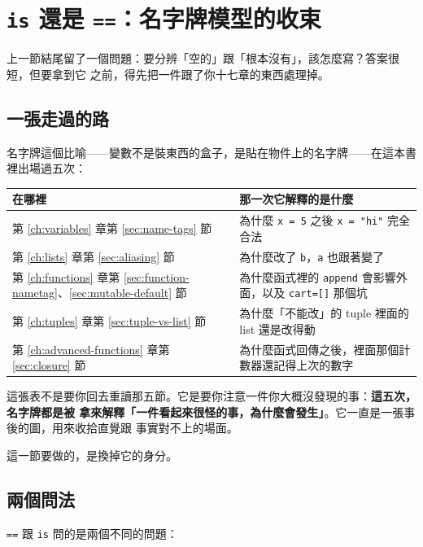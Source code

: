 \section{\texttt{is} 還是 \texttt{==}：名字牌模型的收束}
\label{sec:is-vs-equal}

上一節結尾留了一個問題：要分辨「空的」跟「根本沒有」，該怎麼寫？答案很短，但要拿到它
之前，得先把一件跟了你十七章的東西處理掉。

\subsection*{一張走過的路}

名字牌這個比喻——變數不是裝東西的盒子，是貼在物件上的名字牌——在這本書裡出場過五次：

\begin{center}
\begin{tabular}{@{}p{5.2cm}p{9.2cm}@{}}
\toprule
在哪裡 & 那一次它解釋的是什麼 \\
\midrule
第 \ref{ch:variables} 章第 \ref{sec:name-tags} 節 &
為什麼 \texttt{x = 5} 之後 \texttt{x = "hi"} 完全合法 \\
\addlinespace
第 \ref{ch:lists} 章第 \ref{sec:aliasing} 節 &
為什麼改了 \texttt{b}，\texttt{a} 也跟著變了 \\
\addlinespace
第 \ref{ch:functions} 章第 \ref{sec:function-nametag}、\ref{sec:mutable-default} 節 &
為什麼函式裡的 \texttt{append} 會影響外面，以及 \texttt{cart=[]} 那個坑 \\
\addlinespace
第 \ref{ch:tuples} 章第 \ref{sec:tuple-vs-list} 節 &
為什麼「不能改」的 tuple 裡面的 list 還是改得動 \\
\addlinespace
第 \ref{ch:advanced-functions} 章第 \ref{sec:closure} 節 &
為什麼函式回傳之後，裡面那個計數器還記得上次的數字 \\
\bottomrule
\end{tabular}
\end{center}

這張表不是要你回去重讀那五節。它是要你注意一件你大概沒發現的事：\textbf{這五次，名字牌都是被
拿來解釋「一件看起來很怪的事，為什麼會發生」}。它一直是一張事後的圖，用來收拾直覺跟
事實對不上的場面。

這一節要做的，是換掉它的身分。

\subsection*{兩個問法}

\texttt{==} 跟 \texttt{is} 問的是兩個不同的問題：

